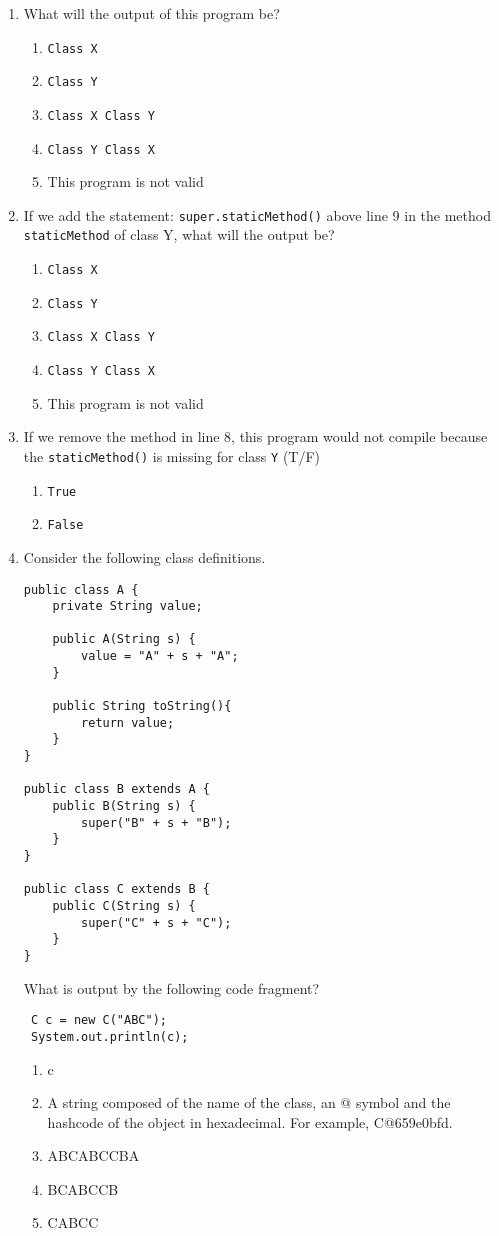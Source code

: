 \documentclass[CS180-S16-FinalExam.tex]{subfiles}
\begin{document}
\begin{enumerate}
\item What will the output of this program be?
\begin{enumerate}
\item \texttt{Class X}
\item \texttt{Class Y} \ifdraft \Ans \fi
\item \texttt{Class X Class Y}
\item \texttt{Class Y Class X}
\item This program is not valid
\end{enumerate}

\item If we add the statement: \texttt{super.staticMethod()} above line 9 in the method \texttt{staticMethod} of class Y, what will the output be?
\begin{enumerate}
\item \texttt{Class X}
\item \texttt{Class Y}
\item \texttt{Class X Class Y} \ifdraft \Ans \fi
\item \texttt{Class Y Class X}
\item This program is not valid
\end{enumerate}

\item If we remove the method in line 8, this program would not compile because the \texttt{staticMethod()} is missing for class \texttt{Y} (T/F)
\begin{enumerate}
\item \texttt{True}
\item \texttt{False} \ifdraft \Ans \fi
\end{enumerate}

\clearpage
\item Consider the following class definitions.
\begin{lstlisting}
public class A {
	private String value;
    
    public A(String s) {
    	value = "A" + s + "A";
    }
    
    public String toString(){
    	return value;
    }
}

public class B extends A {
	public B(String s) {
    	super("B" + s + "B");
    }
}

public class C extends B {
	public C(String s) {
		super("C" + s + "C");
    }
}
\end{lstlisting}
What is output by the following code fragment?
\begin{lstlisting}
 C c = new C("ABC");
 System.out.println(c);
\end{lstlisting}
\begin{enumerate}
\item c
\item A string composed of the name of the class, an @ symbol and the hashcode of the object in hexadecimal. For example, C@659e0bfd.
\item ABCABCCBA \ifdraft \Ans \fi
\item BCABCCB
\item CABCC
\end{enumerate}


\end{enumerate}
\end{document}
